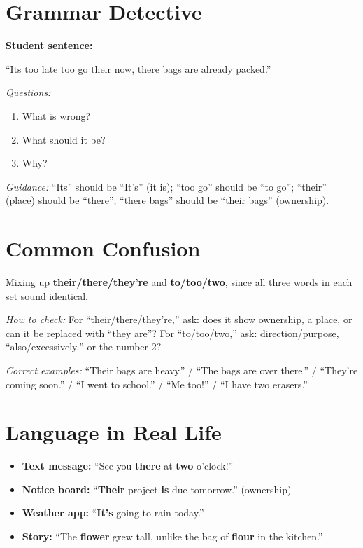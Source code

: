 \section{Grammar Detective}
\begin{detectivebox}
\textbf{Student sentence:}

``Its too late too go their now, there bags are already packed.''

\textit{Questions:}
\begin{enumerate}
    \item What is wrong?
    \item What should it be?
    \item Why?
\end{enumerate}

\textit{Guidance:} ``Its'' should be ``It's'' (it is); ``too go'' should be ``to go''; ``their'' (place) should be ``there''; ``there bags'' should be ``their bags'' (ownership).
\end{detectivebox}

\section{Common Confusion}
\begin{warningbox}
Mixing up \textbf{their/there/they're} and \textbf{to/too/two}, since all three words in each set sound identical.

\textit{How to check:} For ``their/there/they're,'' ask: does it show ownership, a place, or can it be replaced with ``they are''? For ``to/too/two,'' ask: direction/purpose, ``also/excessively,'' or the number 2?

\textit{Correct examples:} ``Their bags are heavy.'' / ``The bags are over there.'' / ``They're coming soon.'' / ``I went to school.'' / ``Me too!'' / ``I have two erasers.''
\end{warningbox}

\section{Language in Real Life}
\begin{itemize}
    \item \textbf{Text message:} ``See you \textbf{there} at \textbf{two} o'clock!''
    \item \textbf{Notice board:} ``\textbf{Their} project \textbf{is} due tomorrow.'' (ownership)
    \item \textbf{Weather app:} ``\textbf{It's} going to rain today.''
    \item \textbf{Story:} ``The \textbf{flower} grew tall, unlike the bag of \textbf{flour} in the kitchen.''
\end{itemize}

